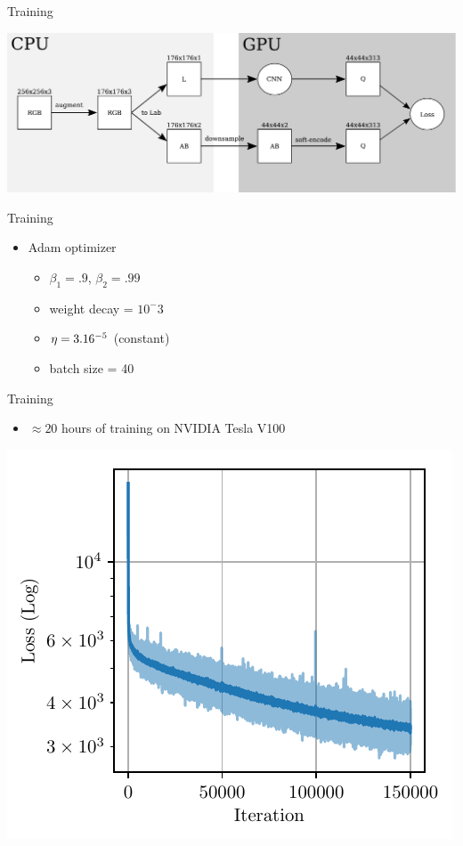 \documentclass{beamer}
\begin{document}

\begin{frame}{Training}
  \begin{center}
    \includegraphics[width=\textwidth]{resources/training.pdf}
  \end{center}
\end{frame}

\begin{frame}{Training}
  \begin{itemize}
    \item Adam optimizer
       \begin{itemize}
         \item $\beta_1 = .9$, $\beta_2 = .99$
         \item weight decay = $10^-3$
         \item $\eta = 3.16 \time 10^{-5}$ (constant)
         \item batch size = 40
       \end{itemize}
  \end{itemize}
\end{frame}

\begin{frame}{Training}
  \begin{itemize}
    \item $\approx 20$ hours of training on NVIDIA Tesla V100
  \end{itemize}

  \begin{center}
    \includegraphics[width=.6\textwidth]{resources/learning_curve.pdf}
  \end{center}
\end{frame}
\end{document}
